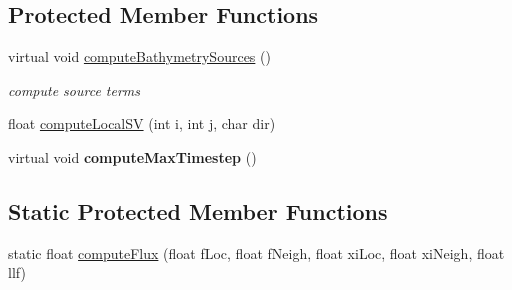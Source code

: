 \subsection*{Protected Member Functions}
\begin{DoxyCompactItemize}
\item 
virtual void \hyperlink{classSWE__RusanovBlock_ac7306305d9c39e418301fc588693c88b}{compute\-Bathymetry\-Sources} ()
\begin{DoxyCompactList}\small\item\em compute source terms \end{DoxyCompactList}\item 
float \hyperlink{classSWE__RusanovBlock_a5a2f154dd2110e8515829564dd806530}{compute\-Local\-S\-V} (int i, int j, char dir)
\item 
\hypertarget{classSWE__RusanovBlock_a88b3537e5dbe509b0b7495b8e28275bf}{virtual void {\bfseries compute\-Max\-Timestep} ()}\label{classSWE__RusanovBlock_a88b3537e5dbe509b0b7495b8e28275bf}

\end{DoxyCompactItemize}
\subsection*{Static Protected Member Functions}
\begin{DoxyCompactItemize}
\item 
static float \hyperlink{classSWE__RusanovBlock_a37c4e0d841054a32adaa8ab26fb7c208}{compute\-Flux} (float f\-Loc, float f\-Neigh, float xi\-Loc, float xi\-Neigh, float llf)
\end{DoxyCompactItemize}
